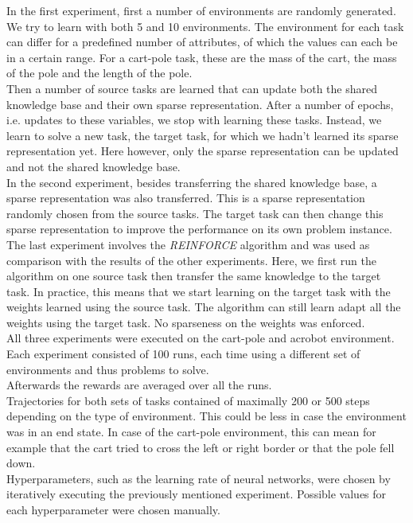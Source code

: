 In the first experiment, first a number of environments are randomly generated. We try to learn with both 5 and 10 environments.
The environment for each task can differ for a predefined number of attributes, of which the values can each be in a certain range. For a cart-pole task, these are the mass of the cart, the mass of the pole and the length of the pole.\\
Then a number of source tasks are learned that can update both the shared knowledge base and their own sparse representation. After a number of epochs, i.e. updates to these variables, we stop with learning these tasks.
Instead, we learn to solve a new task, the target task, for which we hadn't learned its sparse representation yet. Here however, only the sparse representation can be updated and not the shared knowledge base.\\

In the second experiment, besides transferring the shared knowledge base, a sparse representation was also transferred.
This is a sparse representation randomly chosen from the source tasks.
The target task can then change this sparse representation to improve the performance on its own problem instance.\\

The last experiment involves the \textit{REINFORCE} algorithm and was used as comparison with the results of the other experiments.
Here, we first run the algorithm on one source task then transfer the same knowledge to the target task.
In practice, this means that we start learning on the target task with the weights learned using the source task.
The algorithm can still learn adapt all the weights using the target task.
No sparseness on the weights was enforced.\\

All three experiments were executed on the cart-pole and acrobot environment.
Each experiment consisted of 100 runs, each time using a different set of environments and thus problems to solve.\\
Afterwards the rewards are averaged over all the runs.\\
Trajectories for both sets of tasks contained of maximally 200 or 500 steps depending on the type of environment. This could be less in case the environment was in an end state. In case of the cart-pole environment, this can mean for example that the cart tried to cross the left or right border or that the pole fell down.\\
Hyperparameters, such as the learning rate of neural networks, were chosen by iteratively executing the previously mentioned experiment. Possible values for each hyperparameter were chosen manually.

